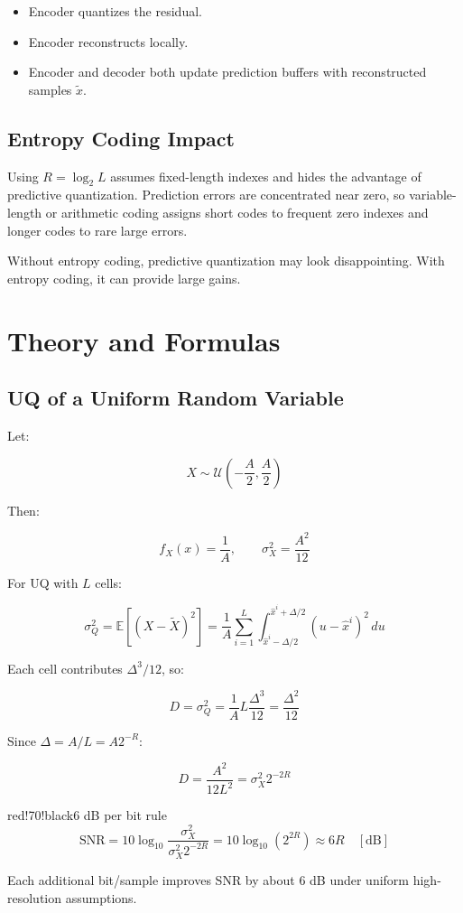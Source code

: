 \begin{itemize}
  \item Encoder quantizes the residual.
  \item Encoder reconstructs locally.
  \item Encoder and decoder both update prediction buffers with reconstructed samples $\tilde{x}$.
\end{itemize}

\subsection{Entropy Coding Impact}

Using $R=\log_2 L$ assumes fixed-length indexes and hides the advantage of predictive quantization. Prediction errors are concentrated near zero, so variable-length or arithmetic coding assigns short codes to frequent zero indexes and longer codes to rare large errors.

Without entropy coding, predictive quantization may look disappointing. With entropy coding, it can provide large gains.

\section{Theory and Formulas}

\subsection{UQ of a Uniform Random Variable}

Let:

\[
X\sim\mathcal{U}\left(-\frac{A}{2},\frac{A}{2}\right)
\]

Then:

\[
f_X(x)=\frac{1}{A}, \qquad \sigma_X^2=\frac{A^2}{12}
\]

For UQ with $L$ cells:

\[
\sigma_Q^2
=\mathbb{E}[(X-\tilde{X})^2]
=\frac{1}{A}\sum_{i=1}^{L}\int_{\hat{x}^i-\Delta/2}^{\hat{x}^i+\Delta/2}(u-\hat{x}^i)^2\,du
\]

Each cell contributes $\Delta^3/12$, so:

\[
D=\sigma_Q^2=\frac{1}{A}L\frac{\Delta^3}{12}
=\frac{\Delta^2}{12}
\]

Since $\Delta=A/L=A2^{-R}$:

\[
D=\frac{A^2}{12L^2}
=\sigma_X^2 2^{-2R}
\]

\begin{calloutbox}{red!70!black}{6 dB per bit rule}
\[
\mathrm{SNR}
=10\log_{10}\frac{\sigma_X^2}{\sigma_X^2 2^{-2R}}
=10\log_{10}(2^{2R})
\approx 6R \quad [\mathrm{dB}]
\]

Each additional bit/sample improves SNR by about 6 dB under uniform high-resolution assumptions.
\end{calloutbox}


